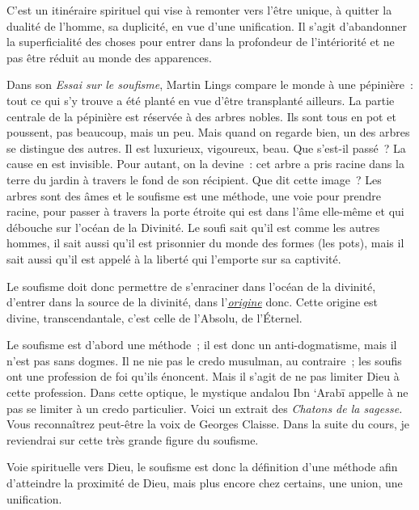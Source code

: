 C'est un itinéraire spirituel qui vise à remonter vers l'être unique, à
quitter la dualité de l'homme, sa duplicité, en vue d'une unification.
Il s'agit d'abandonner la superficialité des choses pour entrer dans la
profondeur de l'intériorité et ne pas être réduit au monde des
apparences.

Dans son \emph{Essai sur le soufisme}, Martin Lings compare le monde à
une pépinière~: tout ce qui s'y trouve a été planté en vue d'être
transplanté ailleurs. La partie centrale de la pépinière est réservée à
des arbres nobles. Ils sont tous en pot et poussent, pas beaucoup, mais
un peu. Mais quand on regarde bien, un des arbres se distingue des
autres. Il est luxurieux, vigoureux, beau. Que s'est-il passé~? La cause
en est invisible. Pour autant, on la devine~: cet arbre a pris racine
dans la terre du jardin à travers le fond de son récipient. Que dit
cette image~? Les arbres sont des âmes et le soufisme est une méthode,
une voie pour prendre racine, pour passer à travers la porte étroite qui
est dans l'âme elle-même et qui débouche sur l'océan de la Divinité. Le
soufi sait qu'il est comme les autres hommes, il sait aussi qu'il est
prisonnier du monde des formes (les pots), mais il sait aussi qu'il est
appelé à la liberté qui l'emporte sur sa captivité.

Le soufisme doit donc permettre de s'enraciner dans l'océan de la
divinité, d'entrer dans la source de la divinité, dans
l'\emph{\underline{origine}} donc. Cette origine est divine,
transcendantale, c'est celle de l'Absolu, de l'Éternel.

Le soufisme est d'abord une méthode~; il est donc un anti-dogmatisme,
mais il n'est pas sans dogmes. Il ne nie pas le credo musulman, au
contraire~; les soufis ont une profession de foi qu'ils énoncent. Mais
il s'agit de ne pas limiter Dieu à cette profession. Dans cette optique,
le mystique andalou Ibn `Arabī appelle à ne pas se limiter à un credo
particulier. Voici un extrait des \emph{Chatons de la sagesse.} Vous
reconnaîtrez peut-être la voix de Georges Claisse. Dans la suite du
cours, je reviendrai sur cette très grande figure du soufisme.

Voie spirituelle vers Dieu, le soufisme est donc la définition d'une
méthode afin d'atteindre la proximité de Dieu, mais plus encore chez
certains, une union, une unification.


